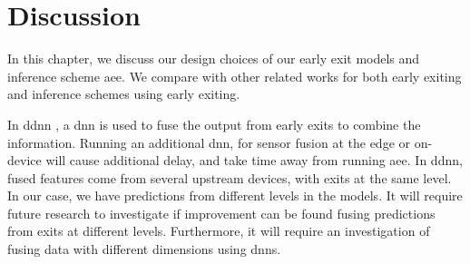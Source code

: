 \hypertarget{discussion}{%
	\chapter{Discussion}\label{ch:discussion}}

In this chapter, we discuss our design choices of our early exit models and inference scheme \gls{aee}. We compare with other related works for both early exiting and inference schemes using early exiting.

In \gls{ddnn} \cite{teerapittayanon_distributed_2017}, a \gls{dnn} is used to fuse the output from early exits to combine the information. Running an additional \gls{dnn}, for sensor fusion at the edge or on-device will cause additional delay, and take time away from running \gls{aee}. In \gls{ddnn}, fused features come from several upstream devices, with exits at the same level. In our case, we have predictions from different levels in the models. It will require future research to investigate if improvement can be found fusing predictions from exits at different levels. Furthermore, it will require an investigation of fusing data with different dimensions using \gls{dnn}s. 

